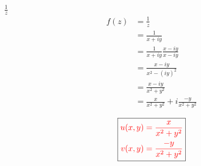 \item[9.] $\frac{1}{z}$
\begin{align*}
    f(z) 
    &= \frac{1}{z} \\
    &= \frac{1}{x+iy} \\
    &= \frac{1}{x+iy} \frac{x-iy}{x-iy}\\
    &= \frac{x-iy}{x^2-(iy)^2}\\
    &= \frac{x-iy}{x^2+y^2}\\
    &= \frac{x}{x^2+y^2} + i\frac{-y}{x^2+y^2}\\
\end{align*}
\[
\boxed{
\textcolor{red}{
\begin{aligned}
u(x,y) &= \frac{x}{x^2+y^2} \\
v(x,y) &= \frac{-y}{x^2+y^2}
\end{aligned}
}
}
\]
